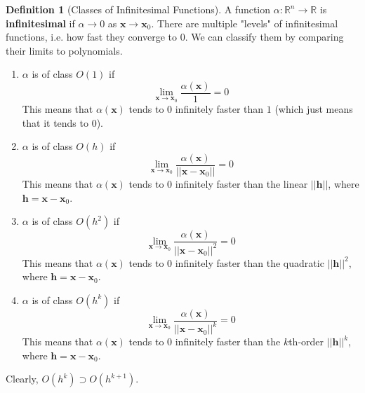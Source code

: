 \documentclass{article}
\theoremstyle{remark}
\theoremstyle{definition}
\newtheorem{definition}{Definition}[section]
\begin{document}
\begin{definition}[Classes of Infinitesimal Functions]
A function $\alpha: \mathbb{R}^n \longrightarrow \mathbb{R}$ is \textbf{infinitesimal} if $\alpha \rightarrow 0$ as $\mathbf{x} \rightarrow \mathbf{x}_0$. There are multiple "levels" of infinitesimal functions, i.e. how fast they converge to $0$. We can classify them by comparing their limits to polynomials. 
\begin{enumerate}
    \item $\alpha$ is of class $O(1)$ if 
    \[\lim_{\mathbf{x} \rightarrow \mathbf{x}_0} \frac{\alpha(\mathbf{x})}{1} = 0\]
    This means that $\alpha(\mathbf{x})$ tends to $0$ infinitely faster than $1$ (which just means that it tends to $0$). 
    
    \item $\alpha$ is of class $O(h)$ if 
    \[\lim_{\mathbf{x} \rightarrow \mathbf{x}_0}
    \frac{\alpha(\mathbf{x})}{||\mathbf{x} - \mathbf{x}_0||} = 0\]
    This means that $\alpha(\mathbf{x})$ tends to $0$ infinitely faster than the linear $||\mathbf{h}||$, where $\mathbf{h} = \mathbf{x} - \mathbf{x}_0$. 
    
    \item $\alpha$ is of class $O(h^2)$ if 
    \[\lim_{\mathbf{x} \rightarrow \mathbf{x}_0} \frac{\alpha(\mathbf{x})}{||\mathbf{x} - \mathbf{x}_0||^2} = 0\]
    This means that $\alpha(\mathbf{x})$ tends to $0$ infinitely faster than the quadratic $||\mathbf{h}||^2$, where $\mathbf{h} = \mathbf{x} - \mathbf{x}_0$. 
    
    \item $\alpha$ is of class $O(h^k)$ if 
    \[\lim_{\mathbf{x} \rightarrow \mathbf{x}_0} \frac{\alpha(\mathbf{x})}{||\mathbf{x} - \mathbf{x}_0||^k} = 0\]
    This means that $\alpha(\mathbf{x})$ tends to $0$ infinitely faster than the $k$th-order $||\mathbf{h}||^k$, where $\mathbf{h} = \mathbf{x} - \mathbf{x}_0$. 
\end{enumerate}
Clearly, $O(h^k) \supset O(h^{k+1})$. 
\end{definition}
\end{document}
